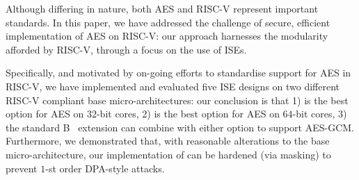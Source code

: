 
Although differing in nature, both AES and RISC-V represent important
standards.  In this paper, we have addressed the challenge of secure, 
efficient implementation of AES on RISC-V: our approach harnesses the
modularity afforded by RISC-V, through a focus on the use of ISEs.

Specifically, and motivated by on-going efforts to standardise support 
for AES in RISC-V, we have implemented and evaluated five ISE designs 
on two different RISC-V compliant base micro-architectures:
our conclusion is that
1) 
   is the best option for 
   AES on $32$-bit cores,
2) 
   is the best option for 
   AES on $64$-bit cores,
3) the
   standard 
   B~\cite[Section 17]{RV:ISA:I:19}
   extension
   can combine with either option to support AES-GCM.
Furthermore, we demonstrated that, with reasonable alterations to the
base micro-architecture, our implementation of  can be hardened
(via masking) to prevent $1$-st order DPA-style attacks.

%

